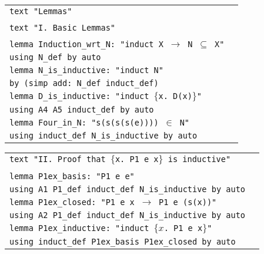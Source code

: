 \documentclass[11pt,a4paper]{article}
\newcommand{\bt}[2]{\small \begin{center}\begin{tabular}{p{#1 cm}p{#2 cm}}}
\def\et{\end{tabular}\end{center}\normalsize}
\theoremstyle{definition}
\begin{document}
\bt{14}{0}
\texttt{text "Lemmas"}\\
\\
\texttt{text "I. Basic Lemmas"}\\
\\
\texttt{lemma Induction\_wrt\_N: "induct X $\longrightarrow$ N $\subseteq$ X"} \\
\hspace{3mm}\texttt{using N\_def by auto}\\
\texttt{lemma N\_is\_inductive: "induct N"}\\
\hspace{3mm}\texttt{by (simp add: N\_def induct\_def)}\\
\texttt{lemma D\_is\_inductive: "induct $\{$x. D(x)$\}$"} \\
\hspace{3mm}\texttt{using A4 A5 induct\_def by auto}\\
\texttt{lemma Four\_in\_N: "s(s(s(s(e)))) $\in$ N"} \\
\hspace{3mm}\texttt{using induct\_def N\_is\_inductive by auto}\\
\et
\bt{14}{0}
\texttt{text "II. Proof that $\{$x. P1 e x$\}$ is inductive"}\\
\\
\texttt{lemma P1ex\_basis: "P1 e e"} \\
\hspace{3mm} \texttt{using A1 P1\_def induct\_def N\_is\_inductive by auto}\\
\texttt{lemma P1ex\_closed: "P1 e x $\longrightarrow$ P1 e (s(x))"}\\
 \hspace{3mm} \texttt{using A2 P1\_def induct\_def N\_is\_inductive by auto}\\
\texttt{lemma P1ex\_inductive: "induct $\{x$. P1 e x$\}$"} \\
 \hspace{3mm} \texttt{using induct\_def P1ex\_basis P1ex\_closed by auto}
 \et
\end{document}
